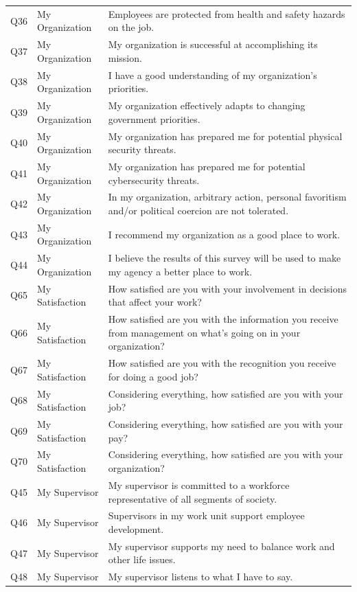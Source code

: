 \documentclass[
  man]{apa7}
\newenvironment{lltable}{\begin{landscape}\centering\begin{ThreePartTable}}{\end{ThreePartTable}\end{landscape}}
\begin{document}
\begin{lltable}
{\begin{longtable}{lll}
Q36 & My Organization & Employees are protected from health and safety hazards on the job.\\
Q37 & My Organization & My organization is successful at accomplishing its mission.\\
Q38 & My Organization & I have a good understanding of my organization’s priorities.\\
Q39 & My Organization & My organization effectively adapts to changing government priorities.\\
Q40 & My Organization & My organization has prepared me for potential physical security threats.\\
Q41 & My Organization & My organization has prepared me for potential cybersecurity threats.\\
Q42 & My Organization & In my organization, arbitrary action, personal favoritism and/or political coercion are not tolerated.\\
Q43 & My Organization & I recommend my organization as a good place to work.\\
Q44 & My Organization & I believe the results of this survey will be used to make my agency a better place to work.\\
Q65 & My Satisfaction & How satisfied are you with your involvement in decisions that affect your work?\\
Q66 & My Satisfaction & How satisfied are you with the information you receive from management on what's going on in your organization?\\
Q67 & My Satisfaction & How satisfied are you with the recognition you receive for doing a good job?\\
Q68 & My Satisfaction & Considering everything, how satisfied are you with your job?\\
Q69 & My Satisfaction & Considering everything, how satisfied are you with your pay?\\
Q70 & My Satisfaction & Considering everything, how satisfied are you with your organization?\\
Q45 & My Supervisor & My supervisor is committed to a workforce representative of all segments of society.\\
Q46 & My Supervisor & Supervisors in my work unit support employee development.\\
Q47 & My Supervisor & My supervisor supports my need to balance work and other life issues.\\
Q48 & My Supervisor & My supervisor listens to what I have to say.\\

\end{longtable}}
\end{lltable}
\end{document}
